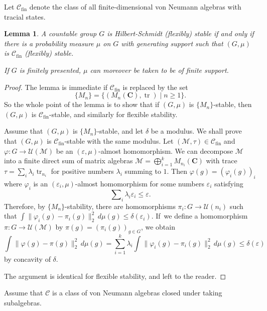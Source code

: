 \documentclass[10pt]{amsart}
\theoremstyle{plain}
\newtheorem{lemma}[theorem]{Lemma}
\theoremstyle{definition}
\newcommand{\C}{\mathbf{C}}
\newcommand{\cM}{\mathcal{M}}
\newcommand{\vn}{\mathcal{C}}
\newcommand{\cU}{\mathcal{U}}
\DeclareMathOperator{\tr}{tr}
\begin{document}
Let $\vn_{\mathrm{fin}}$ denote the class of all finite-dimensional von Neumann algebras with tracial states.
\begin{lemma} A countable group $G$ is Hilbert-Schmidt (flexibly) stable if and only if there is a probability measure $\mu$ on $G$ with generating support such that $(G,\mu)$ is $\vn_{\mathrm{fin}}$ (flexibly) stable.

If $G$ is finitely presented, $\mu$ can moreover be taken to be of finite support.
\end{lemma}
\begin{proof}
The lemma is immediate if $\vn_{\mathrm{fin}}$ is replaced by the set \[
\{M_n\} = \{(M_n(\C),\tr) \mid n\geq 1\}.
\] So the whole point of the lemma is to show that if $(G,\mu)$ is $\{M_n\}$-stable, then $(G,\mu)$ is $\vn_{\mathrm{fin}}$-stable, and similarly for flexible stability.

Assume that $(G,\mu)$ is $\{M_n\}$-stable, and let $\delta$ be a modulus. We shall prove that $(G,\mu)$ is $\vn_{\mathrm{fin}}$-stable with the same modulus. Let $(\cM,\tau) \in \vn_{\mathrm{fin}}$ and $\varphi:G\to \cU(\cM)$ be an $(\varepsilon,\mu)$-almost homomorphism. We can decompose $\cM$ into a finite direct sum of matrix algebras $\cM = \bigoplus_{i=1}^k M_{n_i}(\C)$ with trace $\tau = \sum_i \lambda_i \tr_{n_i}$ for positive numbers $\lambda_i$ summing to $1$. Then $\varphi(g) = (\varphi_i(g))_i$ where $\varphi_i$ is an $(\varepsilon_i,\mu)$-almost homomorphism for some numbers $\varepsilon_i$ satisfying
\[
\sum\nolimits_i \lambda_i\varepsilon_i\leq\varepsilon.
\]
Therefore, by $\{M_n\}$-stability, there are homomorphisms $\pi_i \colon G\to\cU(n_i)$ such that $\int\|\varphi_i(g) - \pi_i(g)\|_2^2\,d\mu(g) \leq \delta(\varepsilon_i)$. If~we define a homomorphism $\pi:G\to \cU(\cM)$ by $\pi(g) = (\pi_i(g))_{g\in G}$, we obtain
\[
\int \|\varphi(g) - \pi(g)\|_2^2 \,d\mu(g) = \sum_{i=1}^k\lambda_i \int\|\varphi_i(g) - \pi_i(g)\|_2^2\,d\mu(g) \leq \delta(\varepsilon)
\]
by concavity of $\delta$.

The argument is identical for flexible stability, and left to the reader.
\end{proof}

Assume that $\vn$ is a class of von Neumann algebras closed under taking subalgebras.
\end{document}
